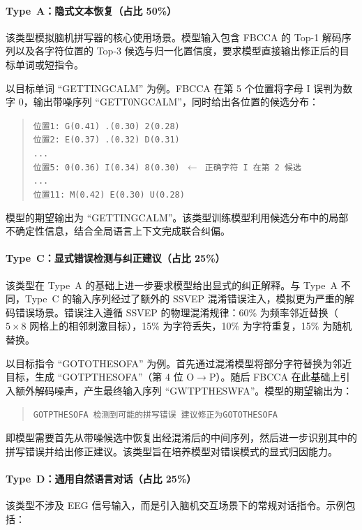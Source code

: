 \paragraph{Type~A：隐式文本恢复（占比 50\%）}
该类型模拟脑机拼写器的核心使用场景。模型输入包含 FBCCA 的 Top-1 解码序列以及各字符位置的 Top-3 候选与归一化置信度，要求模型直接输出修正后的目标单词或短指令。

以目标单词 ``GETTINGCALM'' 为例。FBCCA 在第 5 个位置将字母 I 误判为数字 0，输出带噪序列 ``GETT0NGCALM''，同时给出各位置的候选分布：

\begin{quote}
\small
\texttt{位置1: G(0.41) .(0.30) 2(0.28)} \\
\texttt{位置2: E(0.37) .(0.32) D(0.31)} \\
\texttt{...} \\
\texttt{位置5: 0(0.36) I(0.34) 8(0.30)  $\leftarrow$ 正确字符 I 在第 2 候选} \\
\texttt{...} \\
\texttt{位置11: M(0.42) E(0.30) U(0.28)}
\end{quote}

模型的期望输出为 ``GETTINGCALM''。该类型训练模型利用候选分布中的局部不确定性信息，结合全局语言上下文完成联合纠偏。

\paragraph{Type~C：显式错误检测与纠正建议（占比 25\%）}
该类型在 Type~A 的基础上进一步要求模型给出显式的纠正解释。与 Type~A 不同，Type~C 的输入序列经过了额外的 SSVEP 混淆错误注入，模拟更为严重的解码错误场景。错误注入遵循 SSVEP 的物理混淆规律：60\% 为频率邻近替换（$5\times 8$ 网格上的相邻刺激目标），15\% 为字符丢失，10\% 为字符重复，15\% 为随机替换。

以目标指令 ``GOTOTHESOFA'' 为例。首先通过混淆模型将部分字符替换为邻近目标，生成 ``GOTPTHESOFA''（第 4 位 O$\rightarrow$P）。随后 FBCCA 在此基础上引入额外解码噪声，产生最终输入序列 ``GWTPTHESWFA''。模型的期望输出为：

\begin{quote}
\small
\texttt{GOTPTHESOFA 检测到可能的拼写错误 建议修正为GOTOTHESOFA}
\end{quote}

即模型需要首先从带噪候选中恢复出经混淆后的中间序列，然后进一步识别其中的拼写错误并给出修正建议。该类型旨在培养模型对错误模式的显式归因能力。

\paragraph{Type~D：通用自然语言对话（占比 25\%）}
该类型不涉及 EEG 信号输入，而是引入脑机交互场景下的常规对话指令。示例包括：

